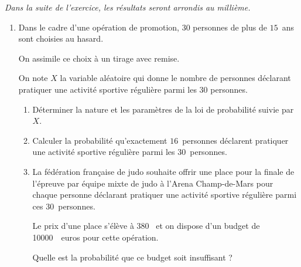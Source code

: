 \documentclass[10pt]{article}
\providecommand{\euro}{\texteuro}
\providecommand{\np}[2][]{{#2~#1}}
\providecommand{\euro}{{\text{€}}}
\renewcommand{\euro}{\ifmmode\text{\texteuro}\else\texteuro\fi}
\begin{document}
\medskip

\emph{Dans la suite de l'exercice, les résultats seront arrondis au millième.}

\begin{enumerate}[resume]
\item Dans le cadre d'une opération de promotion, $30$ personnes de plus de $15$~ans sont choisies au hasard.
	
On assimile ce choix à un tirage avec remise.
	
On note $X$ la variable aléatoire qui donne le nombre de personnes déclarant pratiquer une activité sportive régulière parmi les $30$ personnes.
	\begin{enumerate}
		\item Déterminer la nature et les paramètres de la loi de probabilité suivie par $X$.
		\item Calculer la probabilité qu'exactement $16$~personnes déclarent pratiquer une activité sportive régulière parmi les $30$~personnes.
		\item La fédération française de judo souhaite offrir une place pour la finale de l'épreuve par équipe mixte de judo à l'Arena Champ-de-Mars pour chaque personne déclarant pratiquer une activité sportive régulière parmi ces $30$~personnes.
		
Le prix d'une place s'élève à 380~\euro{} et on dispose d'un budget de \np{10000}~euros pour cette opération.
		
Quelle est la probabilité que ce budget soit insuffisant ?
	\end{enumerate}
\end{enumerate}
\end{document}
